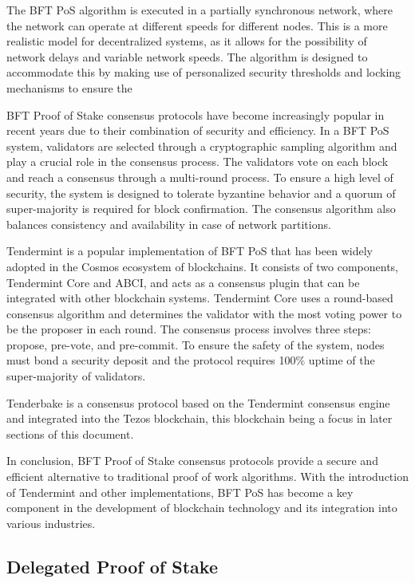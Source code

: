 The BFT PoS algorithm is executed in a partially synchronous network, where the network can operate at different speeds for different nodes. This is a more realistic model for decentralized systems, as it allows for the possibility of network delays and variable network speeds. The algorithm is designed to accommodate this by making use of personalized security thresholds and locking mechanisms to ensure the

BFT Proof of Stake consensus protocols have become increasingly popular in recent years due to their combination of security and efficiency. In a BFT PoS system, validators are selected through a cryptographic sampling algorithm and play a crucial role in the consensus process. The validators vote on each block and reach a consensus through a multi-round process. To ensure a high level of security, the system is designed to tolerate byzantine behavior and a quorum of super-majority is required for block confirmation. The consensus algorithm also balances consistency and availability in case of network partitions.

Tendermint is a popular implementation of BFT PoS that has been widely adopted in the Cosmos ecosystem of blockchains. It consists of two components, Tendermint Core and ABCI, and acts as a consensus plugin that can be integrated with other blockchain systems. Tendermint Core uses a round-based consensus algorithm and determines the validator with the most voting power to be the proposer in each round. The consensus process involves three steps: propose, pre-vote, and pre-commit. To ensure the safety of the system, nodes must bond a security deposit and the protocol requires 100\% uptime of the super-majority of validators.

Tenderbake is a consensus protocol based on the Tendermint consensus engine and integrated into the Tezos blockchain, this blockchain being a focus in later sections of this document.

In conclusion, BFT Proof of Stake consensus protocols provide a secure and efficient alternative to traditional proof of work algorithms. With the introduction of Tendermint and other implementations, BFT PoS has become a key component in the development of blockchain technology and its integration into various industries.

\subsection*{\textbf{Delegated Proof of Stake}}

